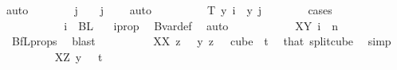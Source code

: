 \begin{isabellebody}
\ auto\isanewline
\ \ \ \ \ \ \isamarkupfalse%
\ {\isachardoublequoteopen}j\ {\isacharequal}{\kern0pt}\ {}{\isachardoublequoteclose}\ {\isacharbar}{\kern0pt}\ {\isachardoublequoteopen}j\ {\isachargreater}{\kern0pt}\ {}{\isachardoublequoteclose}\ \isamarkupfalse%
\ auto\isanewline
\ \ \ \ \ \ \isamarkupfalse%
\ \isamarkupfalse%
\ {\isachardoublequoteopen}T\ y\ i\ {\isacharequal}{\kern0pt}\ y\ j{\isachardoublequoteclose}\isanewline
\ \ \ \ \ \ \isamarkupfalse%
\ cases\isanewline
\ \ \ \ \ \ \ \ \isamarkupfalse%
\ {}\isanewline
\ \ \ \ \ \ \ \ \isamarkupfalse%
\ \isamarkupfalse%
\ {\isachardoublequoteopen}i\ {\isasymin}\ BL\ {}{\isachardoublequoteclose}\ \isamarkupfalse%
\ i{\isacharunderscore}{\kern0pt}prop\ \isamarkupfalse%
\ Bvar{\isacharunderscore}{\kern0pt}def\ \isamarkupfalse%
\ auto\isanewline
\ \ \ \ \ \ \ \ \isamarkupfalse%
\ \isamarkupfalse%
\ XY{\isacharcolon}{\kern0pt}\ {\isachardoublequoteopen}i\ {\isasymin}\ {\isacharbraceleft}{\kern0pt}{\isachardot}{\kern0pt}{\isachardot}{\kern0pt}{\isacharless}{\kern0pt}n{\isacharbraceright}{\kern0pt}{\isachardoublequoteclose}\ \isamarkupfalse%
\ {}\ BfL{\isacharunderscore}{\kern0pt}props{\isacharparenleft}{\kern0pt}{}{\isacharparenright}{\kern0pt}\ \isamarkupfalse%
\ blast\isanewline
\ \ \ \ \ \ \ \ \isamarkupfalse%
\ XX{\isacharcolon}{\kern0pt}\ {\isachardoublequoteopen}{\isacharparenleft}{\kern0pt}{\isasymlambda}z\ {\isasymin}\ {\isacharbraceleft}{\kern0pt}{\isachardot}{\kern0pt}{\isachardot}{\kern0pt}{\isacharless}{\kern0pt}{}{\isacharbraceright}{\kern0pt}{\isachardot}{\kern0pt}\ y\ z{\isacharparenright}{\kern0pt}\ \ {\isasymin}\ cube\ {}\ {\isacharparenleft}{\kern0pt}t{\isacharplus}{\kern0pt}{}{\isacharparenright}{\kern0pt}{\isachardoublequoteclose}\ \isamarkupfalse%
\ that\ split{\isacharunderscore}{\kern0pt}cube\ \isamarkupfalse%
\ simp\isanewline
\ \ \ \ \ \ \ \ \isamarkupfalse%
\ XZ{\isacharcolon}{\kern0pt}\ {\isachardoublequoteopen}y\ {}\ {\isasymin}\ {\isacharbraceleft}{\kern0pt}{\isachardot}{\kern0pt}{\isachardot}{\kern0pt}{\isacharless}{\kern0pt}t{\isacharplus}{\kern0pt}{}{\isacharbraceright}{\kern0pt}{\isachardoublequoteclose}\ \isamarkupfalse%

\end{isabellebody}
